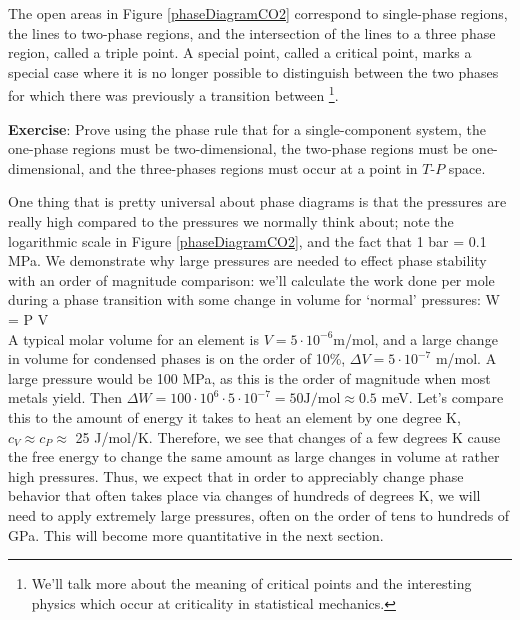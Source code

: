 \documentclass[12pt]{article}
\begin{document}
The open areas in Figure \ref{phaseDiagramCO2} correspond to single-phase regions, the lines to two-phase regions, and the intersection of the lines to a three phase region, called a triple point. A special point, called a critical point, marks a special case where it is no longer possible to distinguish between the two phases for which there was previously a transition between \footnote{We'll talk more about the meaning of critical points and the interesting physics which occur at criticality in statistical mechanics.}.

\textbf{Exercise}: Prove using the phase rule that for a single-component system, the one-phase regions must be two-dimensional, the two-phase regions must be one-dimensional, and the three-phases regions must occur at a point in $T$-$P$ space.

One thing that is pretty universal about phase diagrams is that the pressures are really high compared to the pressures we normally think about; note the logarithmic scale in Figure \ref{phaseDiagramCO2}, and the fact that 1 bar = 0.1 MPa. We demonstrate why large pressures are needed to effect phase stability with an order of magnitude comparison: we'll calculate the work done per mole during a phase transition with some change in volume for `normal' pressures:
\eqs
\Delta W = P \cdot \Delta V\\
\eqe
A typical molar volume for an element is $V = 5 \cdot 10^{-6}$m\three/mol, and a large change in volume for condensed phases is on the order of 10\%, $\Delta V = 5 \cdot 10^{-7}$ m\three/mol. A large pressure would be 100 MPa, as this is the order of magnitude when most metals yield. Then $\Delta W = 100\cdot 10^{6} \cdot 5 \cdot 10^{-7} = 50 \text{J/mol} \approx 0.5$ meV. Let's compare this to the amount of energy it takes to heat an element by one degree K, $c_V\approx c_P \approx$ 25 J/mol/K. Therefore, we see that changes of a few degrees K cause the free energy to change the same amount as large changes in volume at rather high pressures. Thus, we expect that in order to appreciably change phase behavior that often takes place via changes of hundreds of degrees K, we will need to apply extremely large pressures, often on the order of tens to hundreds of GPa. This will become more quantitative in the next section.

\end{document}
